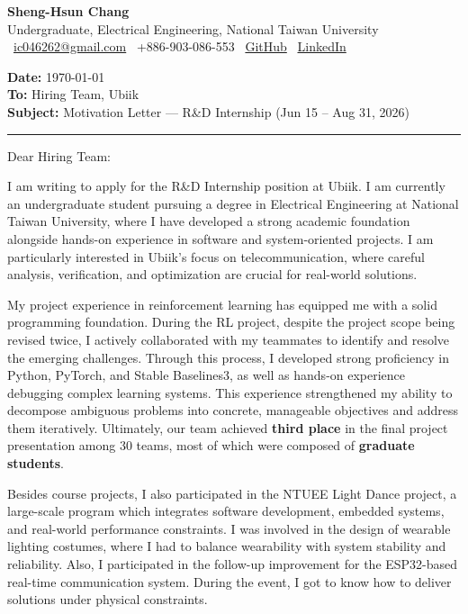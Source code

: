 \documentclass[12pt,a4paper]{article}
\makeatletter
\newcommand{\Name}{Sheng-Hsun Chang}
\newcommand{\Email}{\href{mailto:ic046262@gmail.com}{ic046262@gmail.com}}
\newcommand{\Phone}{+886-903-086-553}
\newcommand{\GitHub}{\href{https://github.com/}{GitHub}}
\newcommand{\LinkedIn}{\href{https://www.linkedin.com/}{LinkedIn}}
\makeatother
\begin{document}
{\LARGE \textbf{\Name}}\\
Undergraduate, Electrical Engineering, National Taiwan University\\
\vspace{2pt}
\faEnvelope\ \Email \quad
\faPhone\ \Phone \quad
\faGithub\ \GitHub \quad
\faLinkedin\ \LinkedIn

\vspace{14pt}

\textbf{Date:} \today\\
\textbf{To:} Hiring Team, Ubiik\\
\textbf{Subject:} Motivation Letter --- R\&D Internship (Jun 15 -- Aug 31, 2026)


\vspace{10pt}
\hrule
Dear Hiring Team:

I am writing to apply for the R\&D Internship position at Ubiik. 
I am currently an undergraduate student pursuing a degree in Electrical Engineering at 
National Taiwan University, where I have developed a strong academic foundation alongside 
hands-on experience in software and system-oriented projects. I am particularly interested in 
Ubiik's focus on telecommunication, where careful analysis, verification, and optimization are crucial
for real-world solutions.

My project experience in reinforcement learning has equipped me with a solid programming foundation. 
During the RL project, despite the project scope being revised twice, I actively collaborated with my teammates to identify and resolve the emerging challenges. Through this process, I developed strong proficiency in Python, PyTorch, and Stable Baselines3, 
as well as hands-on experience debugging complex learning systems. 
This experience strengthened my ability to decompose ambiguous problems into concrete, manageable objectives and address them iteratively. 
Ultimately, our team achieved \textbf{third place} in the final project presentation among 30 teams, most of which were composed of \textbf{graduate students}.

Besides course projects, I also participated in the NTUEE Light Dance project, 
a large-scale program which integrates software development, embedded systems, 
and real-world performance constraints. I was involved in the design of wearable lighting costumes, 
where I had to balance wearability with system stability and reliability. Also, I participated in the follow-up 
improvement for the ESP32-based real-time communication system. During the event, I got to know how to deliver 
solutions under physical constraints.
\end{document}
